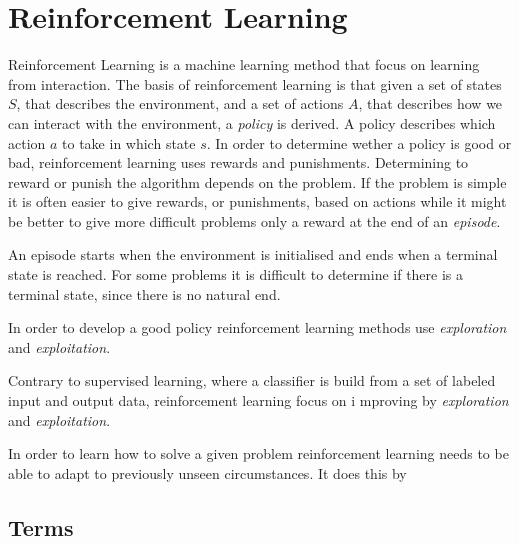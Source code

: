 \documentclass[11pt]{article}
\begin{document}
\maketitle

\section{Reinforcement Learning}

Reinforcement Learning is a machine learning method that focus on learning from interaction.
The basis of reinforcement learning is that given a set of states $S$, that describes the environment,
and a set of actions $A$, that describes how we can interact with the environment,
a \textit{policy} is derived.
A policy describes which action $a$ to take in which state $s$.
In order to determine wether a policy is good or bad, reinforcement learning uses
rewards and punishments.
Determining to reward or punish the algorithm depends on the problem.
If the problem is simple it is often easier to give rewards, or punishments, based on actions
while it might be better to give more difficult problems only a reward at the end of an \textit{episode}.

An episode starts when the environment is initialised and ends when a terminal state is reached.
For some problems it is difficult to determine if there is a terminal state, since there
is no natural end.

In order to develop a good policy reinforcement learning methods use \textit{exploration} and \textit{exploitation}.

Contrary to supervised learning, where a classifier is build from a set of labeled input and output data,
reinforcement learning focus on i mproving by \textit{exploration} and \textit{exploitation}.

In order to learn how to solve a given problem reinforcement learning needs to be able to
adapt to previously unseen circumstances.
It does this by 


\subsection{Terms}



%
%
\end{document}

